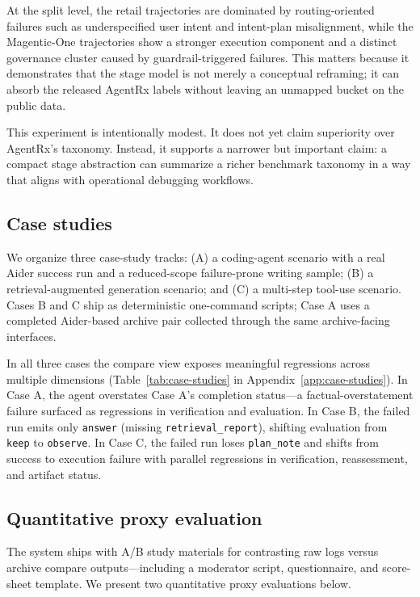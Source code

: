 \documentclass[11pt]{article}
\begin{document}
At the split level, the retail trajectories are dominated by routing-oriented failures such as underspecified user intent and intent-plan misalignment, while the Magentic-One trajectories show a stronger execution component and a distinct governance cluster caused by guardrail-triggered failures. This matters because it demonstrates that the stage model is not merely a conceptual reframing; it can absorb the released AgentRx labels without leaving an unmapped bucket on the public data.

This experiment is intentionally modest. It does not yet claim superiority over AgentRx's taxonomy. Instead, it supports a narrower but important claim: a compact stage abstraction can summarize a richer benchmark taxonomy in a way that aligns with operational debugging workflows.

\subsection{Case studies}

We organize three case-study tracks: (A) a coding-agent scenario with a real Aider success run and a reduced-scope failure-prone writing sample; (B) a retrieval-augmented generation scenario; and (C) a multi-step tool-use scenario. Cases B and C ship as deterministic one-command scripts; Case A uses a completed Aider-based archive pair collected through the same archive-facing interfaces.

In all three cases the compare view exposes meaningful regressions across multiple dimensions (Table~\ref{tab:case-studies} in Appendix~\ref{app:case-studies}). In Case A, the agent overstates Case A's completion status---a factual-overstatement failure surfaced as regressions in verification and evaluation. In Case B, the failed run emits only \texttt{answer} (missing \texttt{retrieval\_report}), shifting evaluation from \texttt{keep} to \texttt{observe}. In Case C, the failed run loses \texttt{plan\_note} and shifts from success to execution failure with parallel regressions in verification, reassessment, and artifact status.

\subsection{Quantitative proxy evaluation}

The system ships with A/B study materials for contrasting raw logs versus archive compare outputs---including a moderator script, questionnaire, and score-sheet template. We present two quantitative proxy evaluations below.
\end{document}

